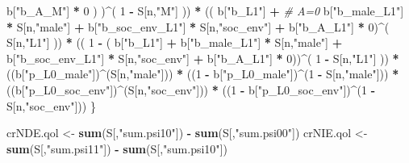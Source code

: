 \documentclass[
]{book}
\newenvironment{Shaded}{\begin{snugshade}}{\end{snugshade}}
\newcommand{\CommentTok}[1]{\textcolor[rgb]{0.56,0.35,0.01}{\textit{#1}}}
\newcommand{\DecValTok}[1]{\textcolor[rgb]{0.00,0.00,0.81}{#1}}
\newcommand{\FunctionTok}[1]{\textcolor[rgb]{0.13,0.29,0.53}{\textbf{#1}}}
\newcommand{\NormalTok}[1]{#1}
\newcommand{\OtherTok}[1]{\textcolor[rgb]{0.56,0.35,0.01}{#1}}
\newcommand{\SpecialCharTok}[1]{\textcolor[rgb]{0.81,0.36,0.00}{\textbf{#1}}}
\newcommand{\StringTok}[1]{\textcolor[rgb]{0.31,0.60,0.02}{#1}}
\begin{document}
\begin{Shaded}
\begin{Highlighting}[]
\NormalTok{                b[}\StringTok{"b\_A\_M"}\NormalTok{] }\SpecialCharTok{*} \DecValTok{0}\NormalTok{ ) )}\SpecialCharTok{\^{}}\NormalTok{( }\DecValTok{1} \SpecialCharTok{{-}}\NormalTok{ S[n,}\StringTok{"M"}\NormalTok{] )) }\SpecialCharTok{*}
\NormalTok{      (( b[}\StringTok{"b\_L1"}\NormalTok{] }\SpecialCharTok{+}                                                            \CommentTok{\# A=0}
\NormalTok{           b[}\StringTok{"b\_male\_L1"}\NormalTok{] }\SpecialCharTok{*}\NormalTok{ S[n,}\StringTok{"male"}\NormalTok{] }\SpecialCharTok{+}  
\NormalTok{           b[}\StringTok{"b\_soc\_env\_L1"}\NormalTok{] }\SpecialCharTok{*}\NormalTok{ S[n,}\StringTok{"soc\_env"}\NormalTok{] }\SpecialCharTok{+}
\NormalTok{           b[}\StringTok{"b\_A\_L1"}\NormalTok{] }\SpecialCharTok{*} \DecValTok{0}\NormalTok{)}\SpecialCharTok{\^{}}\NormalTok{( S[n,}\StringTok{"L1"}\NormalTok{] )) }\SpecialCharTok{*}
\NormalTok{      (( }\DecValTok{1} \SpecialCharTok{{-}}\NormalTok{ ( b[}\StringTok{"b\_L1"}\NormalTok{] }\SpecialCharTok{+}
\NormalTok{                 b[}\StringTok{"b\_male\_L1"}\NormalTok{] }\SpecialCharTok{*}\NormalTok{ S[n,}\StringTok{"male"}\NormalTok{] }\SpecialCharTok{+}  
\NormalTok{                 b[}\StringTok{"b\_soc\_env\_L1"}\NormalTok{] }\SpecialCharTok{*}\NormalTok{ S[n,}\StringTok{"soc\_env"}\NormalTok{] }\SpecialCharTok{+}
\NormalTok{                 b[}\StringTok{"b\_A\_L1"}\NormalTok{] }\SpecialCharTok{*} \DecValTok{0}\NormalTok{))}\SpecialCharTok{\^{}}\NormalTok{( }\DecValTok{1} \SpecialCharTok{{-}}\NormalTok{ S[n,}\StringTok{"L1"}\NormalTok{] )) }\SpecialCharTok{*}
\NormalTok{      ((b[}\StringTok{"p\_L0\_male"}\NormalTok{])}\SpecialCharTok{\^{}}\NormalTok{(S[n,}\StringTok{"male"}\NormalTok{])) }\SpecialCharTok{*} 
\NormalTok{      ((}\DecValTok{1} \SpecialCharTok{{-}}\NormalTok{ b[}\StringTok{"p\_L0\_male"}\NormalTok{])}\SpecialCharTok{\^{}}\NormalTok{(}\DecValTok{1} \SpecialCharTok{{-}}\NormalTok{ S[n,}\StringTok{"male"}\NormalTok{])) }\SpecialCharTok{*} 
\NormalTok{      ((b[}\StringTok{"p\_L0\_soc\_env"}\NormalTok{])}\SpecialCharTok{\^{}}\NormalTok{(S[n,}\StringTok{"soc\_env"}\NormalTok{])) }\SpecialCharTok{*}
\NormalTok{      ((}\DecValTok{1} \SpecialCharTok{{-}}\NormalTok{ b[}\StringTok{"p\_L0\_soc\_env"}\NormalTok{])}\SpecialCharTok{\^{}}\NormalTok{(}\DecValTok{1} \SpecialCharTok{{-}}\NormalTok{ S[n,}\StringTok{"soc\_env"}\NormalTok{])) }
\NormalTok{    \}}
  
\NormalTok{  crNDE.qol }\OtherTok{\textless{}{-}} \FunctionTok{sum}\NormalTok{(S[,}\StringTok{"sum.psi10"}\NormalTok{]) }\SpecialCharTok{{-}} \FunctionTok{sum}\NormalTok{(S[,}\StringTok{"sum.psi00"}\NormalTok{])}
\NormalTok{  crNIE.qol }\OtherTok{\textless{}{-}} \FunctionTok{sum}\NormalTok{(S[,}\StringTok{"sum.psi11"}\NormalTok{]) }\SpecialCharTok{{-}} \FunctionTok{sum}\NormalTok{(S[,}\StringTok{"sum.psi10"}\NormalTok{])}
  

\end{Highlighting}
\end{Shaded}
\end{document}
